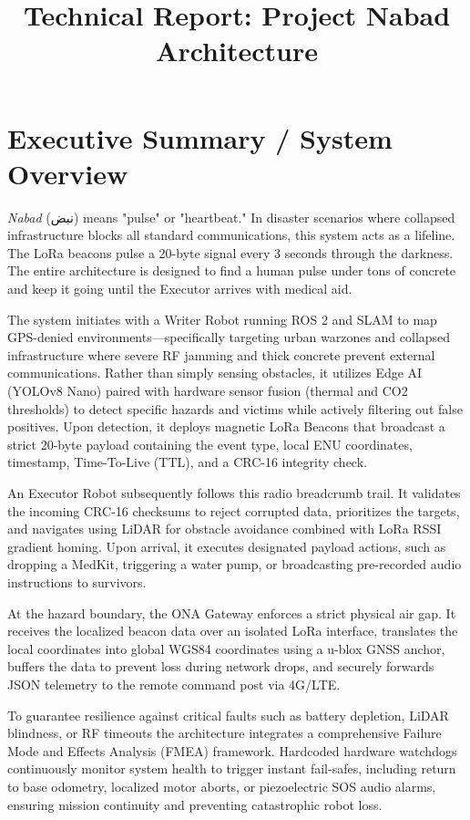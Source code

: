 \documentclass[10pt, letterpaper]{article}
\title{\vspace{-1.5cm}\textbf{\textsf{ Technical Report: Project Nabad Architecture}}\vspace{-0.6cm}}
\date{}
\author{}
\begin{document}
\maketitle
\vspace{-1.2cm}

\section{Executive Summary / System Overview}

\textit{Nabad} (\textarabic{نبض}) means "pulse" or "heartbeat." In disaster scenarios where collapsed infrastructure blocks all standard communications, this system acts as a lifeline. The LoRa beacons pulse a 20-byte signal every 3 seconds through the darkness. The entire architecture is designed to find a human pulse under tons of concrete and keep it going until the Executor arrives with medical aid.

The system initiates with a Writer Robot running ROS 2 and SLAM to map GPS-denied environments—specifically targeting urban warzones and collapsed infrastructure where severe RF jamming and thick concrete prevent external communications. Rather than simply sensing obstacles, it utilizes Edge AI (YOLOv8 Nano) paired with hardware sensor fusion (thermal and CO2 thresholds) to detect specific hazards and victims while actively filtering out false positives. Upon detection, it deploys magnetic LoRa Beacons that broadcast a strict 20-byte payload containing the event type, local ENU coordinates, timestamp, Time-To-Live (TTL), and a CRC-16 integrity check.

An Executor Robot subsequently follows this radio breadcrumb trail. It validates the incoming CRC-16 checksums to reject corrupted data, prioritizes the targets, and navigates using LiDAR for obstacle avoidance combined with LoRa RSSI gradient homing. Upon arrival, it executes designated payload actions, such as dropping a MedKit, triggering a water pump, or broadcasting pre-recorded audio instructions to survivors.

At the hazard boundary, the ONA Gateway enforces a strict physical air gap. It receives the localized beacon data over an isolated LoRa interface, translates the local coordinates into global WGS84 coordinates using a u-blox GNSS anchor, buffers the data to prevent loss during network drops, and securely forwards JSON telemetry to the remote command post via 4G/LTE.

To guarantee resilience against critical faults such as battery depletion, LiDAR blindness, or RF timeouts the architecture integrates a comprehensive Failure Mode and Effects Analysis (FMEA) framework. Hardcoded hardware watchdogs continuously monitor system health to trigger instant fail-safes, including return to base odometry, localized motor aborts, or piezoelectric SOS audio alarms, ensuring mission continuity and preventing catastrophic robot loss.
\end{document}
